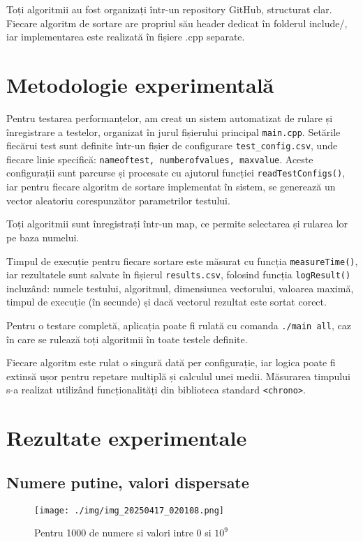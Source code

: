 \documentclass[12pt]{article}
\begin{document}
\begin{justify}
Toți algoritmii au fost organizați într-un repository GitHub, structurat clar.
Fiecare algoritm de sortare are propriul său header dedicat în folderul include/, iar
implementarea este realizată în fișiere .cpp separate.
\end{justify}


\section{Metodologie experimentală}

Pentru testarea performanțelor, am creat un sistem automatizat de rulare și înregistrare a testelor, organizat în jurul fișierului principal \texttt{main.cpp}. Setările fiecărui test sunt definite într-un fișier de configurare \texttt{test\_config.csv}, unde fiecare linie specifică: \texttt{nameoftest, numberofvalues, maxvalue}. Aceste configurații sunt parcurse și procesate cu ajutorul funcției \texttt{readTestConfigs()}, iar pentru fiecare algoritm de sortare implementat în sistem, se generează un vector aleatoriu corespunzător parametrilor testului.

Toți algoritmii sunt înregistrați într-un map, ce permite selectarea și rularea lor pe baza numelui.

Timpul de execuție pentru fiecare sortare este măsurat cu funcția \texttt{measureTime()}, iar rezultatele sunt salvate în fișierul \texttt{results.csv}, folosind funcția \texttt{logResult()} incluzând: numele testului, algoritmul, dimensiunea vectorului, valoarea maximă, timpul de execuție (în secunde) și dacă vectorul rezultat este sortat corect.

Pentru o testare completă, aplicația poate fi rulată cu comanda \texttt{./main all}, caz în care se rulează toți algoritmii în toate testele definite.

\bigskip

Fiecare algoritm este rulat o singură dată per configurație, iar logica poate fi extinsă ușor pentru repetare multiplă și calculul unei medii. Măsurarea timpului s-a realizat utilizând funcționalități din biblioteca standard \texttt{<chrono>}.

\section{Rezultate experimentale}

\subsection{Numere putine, valori dispersate}
\begin{figure}[H]
    \centering
    \texttt{[image: ./img/img\_20250417\_020108.png]} %
    \caption{Pentru 1000 de numere si valori intre 0 si $10^9$}
\end{figure}
\end{document}
